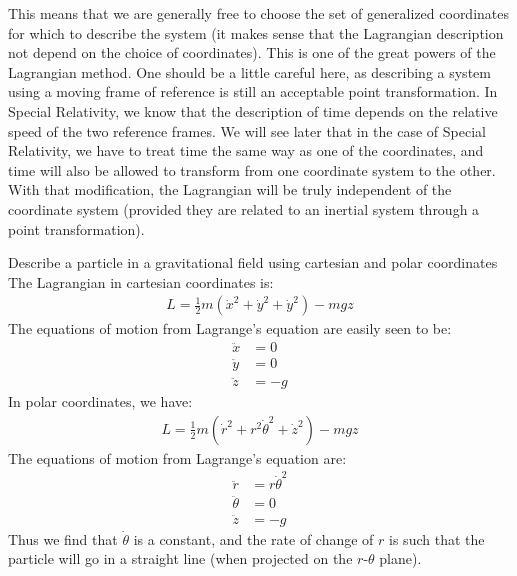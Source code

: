 This means that we are generally free to choose the set of generalized coordinates for which to describe the system (it makes sense that the Lagrangian description not depend on the choice of coordinates). This is one of the great powers of the Lagrangian method. One should be a little careful here, as describing a system using a moving frame of reference is still an acceptable point transformation. In Special Relativity, we know that the description of time depends on the relative speed of the two reference frames. We will see later that in the case of Special Relativity, we have to treat time the same way as one of the coordinates, and time will also be allowed to transform from one coordinate system to the other. With that modification, the Lagrangian will be truly independent of the coordinate system (provided they are related to an inertial system through a point transformation).

\begin{example}{0pt}{Describe a particle in a gravitational field using cartesian and polar coordinates}{}
The Lagrangian in cartesian coordinates is:
\begin{align*}
L=\frac{1}{2}m(\dot{x}^2+\dot{y}^2+\dot{y}^2)-mgz
\end{align*}
The equations of motion from Lagrange's equation are easily seen to be:
\begin{align*}
\ddot{x}&=0\\
\ddot{y}&=0\\
\ddot{z}&=-g
\end{align*}
In polar coordinates, we have:
\begin{align*}
L=\frac{1}{2}m(\dot{r}^2+r^2\dot{\theta}^2+\dot{z}^2)-mgz
\end{align*}
The equations of motion from Lagrange's equation are:
\begin{align*}
\ddot{r}&=r\dot{\theta}^2\\
\ddot{\theta}&=0\\
\ddot{z}&=-g
\end{align*}
Thus we find that $\dot{\theta}$ is a constant, and the rate of change of $r$ is such that the particle will go in a straight line (when projected on the $r$-$\theta$ plane).
\end{example}

